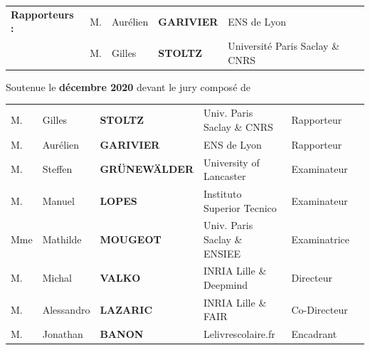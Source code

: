 \documentclass[12pt,fleqn]{book} %
\begin{document}
{\vspace{1.cm}

{\sffamily

\begin{tabular}{lllll}
{\bf\sffamily Rapporteurs :} 
& {M.}   & Aur\' elien & {\bf\sffamily GARIVIER} & ENS de Lyon \\
& {M.}   & Gilles & {\bf\sffamily STOLTZ}     & Universit\'e Paris Saclay \& CNRS \\
\end{tabular}

{\sffamily\vspace{1.cm} Soutenue le {\bf{} décembre 2020} devant le jury
compos{\'e} de}
}
\bigskip

\bigskip

{\sffamily
\begin{tabular}{llllll}
 {M.}   & Gilles & {\bf\sffamily STOLTZ}     & Univ. Paris Saclay \& CNRS & Rapporteur\\
{M.}   & Aur\' elien & {\bf\sffamily GARIVIER} & ENS de Lyon & Rapporteur \\
{M.}   & Steffen & {\bf\sffamily GRÜNEWÄLDER}     &  University of Lancaster & Examinateur\\
{M.}   & Manuel & {\bf\sffamily LOPES}     &  Instituto Superior Tecnico & Examinateur\\
{Mme}   & Mathilde & {\bf\sffamily MOUGEOT}     & Univ. Paris Saclay \& ENSIEE & Examinatrice\\
{M.}   & Michal & {\bf\sffamily VALKO}     &  INRIA Lille \& Deepmind & Directeur\\
{M.}   & Alessandro & {\bf\sffamily LAZARIC}     &  INRIA Lille \& FAIR  & Co-Directeur\\
{M.}   & Jonathan & {\bf\sffamily BANON}     &  Lelivrescolaire.fr & Encadrant\\
\end{tabular}
}
\begin{center}
\small{}
\end{center}


}
\end{document}
